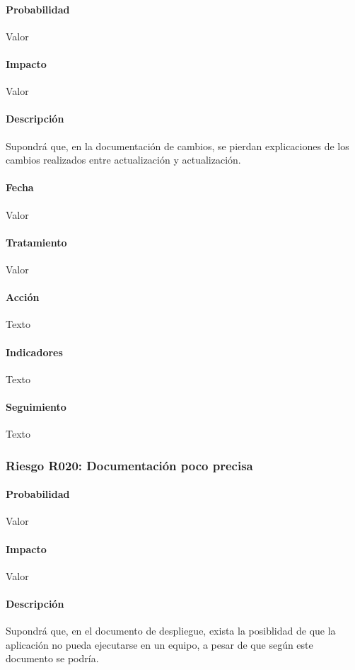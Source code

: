 \documentclass[10pt,a4paper]{article}
\begin{document}
				\paragraph{Probabilidad} Valor
				\paragraph{Impacto}	Valor
				\paragraph{Descripción} Supondrá que, en la documentación de cambios, se pierdan explicaciones de los cambios realizados entre actualización y actualización.
				\paragraph{Fecha} Valor %
				\paragraph{Tratamiento} Valor %
				\paragraph{Acción} Texto %
				\paragraph{Indicadores} Texto %
				\paragraph{Seguimiento}	Texto %
				\subsubsection{Riesgo R020: Documentación poco precisa }
				\paragraph{Probabilidad} Valor
				\paragraph{Impacto}	Valor
				\paragraph{Descripción} Supondrá que, en el documento de despliegue, exista la posiblidad de que la aplicación no pueda ejecutarse en un equipo, a pesar de que según este documento se podría.
\end{document}
